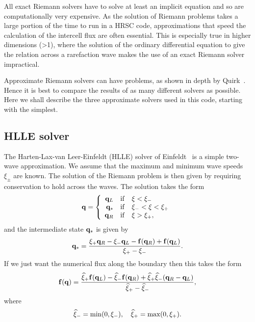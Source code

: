 \documentclass{article}
\begin{document}
All exact Riemann solvers have to solve at least an implicit
equation and so are computationally very expensive. As the 
solution of Riemann problems takes a large portion of
the time to run in a HRSC code, approximations that speed the
calculation of the intercell flux are often essential. This is
especially true in higher dimensions (>1), where the solution of the
ordinary differential equation to give the relation across a
rarefaction wave makes the use of an exact Riemann solver impractical.

Approximate Riemann solvers can have problems, as shown in depth by
Quirk~\cite{Quirk}. Hence it is best to compare the
results of as many different solvers as possible. Here we shall describe
the three approximate solvers used in this code, starting with the
simplest.

\subsection{HLLE solver}
\label{sec:hlle}

The Harten-Lax-van Leer-Einfeldt (HLLE) solver of Einfeldt~\cite{Einfeldt88} is a
simple two-wave approximation. We assume that the maximum and minimum wave speeds
$\xi_{\pm}$ are known. The solution of the Riemann problem is then
given by requiring conservation to hold across the waves. The solution
takes the form
\begin{equation}
  \label{hlle1}
  {\bf q} = \left\{ \begin{array}[c]{r c l} {\bf q}_L & {\rm if} & \xi
        < \xi_- \\  {\bf  q}_* & {\rm if} & \xi_- < \xi < \xi_+ \\
        {\bf q}_R & {\rm if} & \xi   > \xi_+, \end{array}\right. 
\end{equation}
\noindent and the intermediate state ${\bf q}_*$ is given by
\begin{equation}
  \label{hlle2}
  {\bf q}_* = \frac{\xi_+ {\bf q}_R - \xi_- {\bf q}_L - {\bf f}({\bf
  q}_R) + {\bf f}({\bf q}_L)}{\xi_+ - \xi_-}.
\end{equation}
\noindent If we just want the numerical flux along the boundary then
this takes the form
\begin{equation}
  \label{hlleflux}
  {\bf f}({\bf q}) = \frac{\widehat{\xi}_+{\bf f}({\bf q}_L) -
  \widehat{\xi}_-{\bf f}({\bf q}_R) + \widehat{\xi}_+ \widehat{\xi}_-
  ({\bf q}_R - {\bf q}_L)}{\widehat{\xi}_+ - \widehat{\xi}_-},
\end{equation}
\noindent where
\begin{equation}
  \label{hlle3}
  \widehat{\xi}_- = {\rm min}(0, \xi_-), \quad \widehat{\xi}_+ =
  {\rm max}(0, \xi_+). 
\end{equation}
\end{document}
